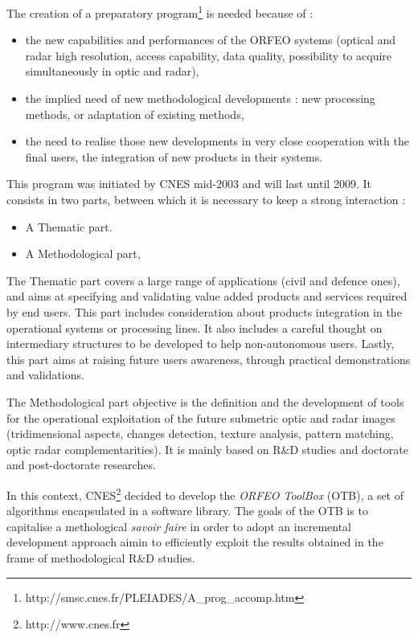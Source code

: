 The creation of a preparatory program\footnote{http://smsc.cnes.fr/PLEIADES/A\_prog\_accomp.htm} is needed because of :
\begin{itemize}
\item the new capabilities and performances of the ORFEO systems (optical and radar high resolution, access capability, data quality, possibility to acquire simultaneously in optic and radar),
\item the implied need of new methodological developments : new processing methods, or adaptation of existing methods,
\item the need to realise those new developments in very close cooperation with the final users, the integration of new products in their systems.
  
\end{itemize}

This program was initiated by CNES mid-2003 and will last until 2009.
It consists in two parts, between which it is necessary to keep a strong interaction :
\begin{itemize}
\item A Thematic part.
\item A Methodological part,
\end{itemize}

The Thematic part covers a large range of applications (civil and
defence ones), and aims at specifying and validating value added
products and services required by end users. This part includes
consideration about products integration in the operational systems or
processing lines. It also includes a careful thought on intermediary
structures to be developed to help non-autonomous users. Lastly, this part aims at raising future users awareness, through practical demonstrations and validations.

The Methodological part objective is the definition and the
development of tools for the operational exploitation of the future
submetric optic and radar images (tridimensional aspects, changes
detection, texture analysis, pattern matching, optic radar
complementarities). It is mainly based on R\&D studies and doctorate
and post-doctorate researches.

In this context, CNES\footnote{http://www.cnes.fr} decided to develop
the \emph{ORFEO ToolBox} (OTB), a set of algorithms encapsulated in a
software library. The goals of the OTB is to capitalise a methological
\textit{savoir faire} in order to adopt an incremental development
approach aimin to efficiently exploit the results obtained in the
frame of methodological R\&D studies.

